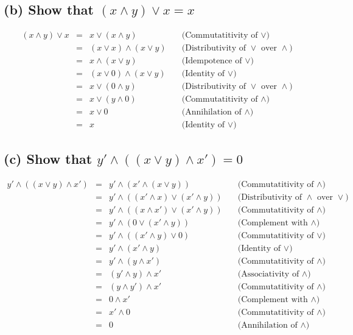 \documentclass[]{article}
\begin{document}
\begin{spacing}{1.5}
	\subsection*{(b) Show that $ (x \wedge  y) \vee  x = x $}
	\[\begin{array}{rclr}
		(x \wedge  y) \vee  x&=& x \vee  (x \wedge  y) &\quad\text{(Commutatitivity of $\vee$)}\\
		&=& (x \vee  x) \wedge  (x \vee  y) &\quad\text{(Distributivity of $\vee$ over $\wedge$)}\\
		&=& x \wedge  (x \vee  y) &\quad\text{(Idempotence of $\vee$)}\\
		&=& (x \vee  0 ) \wedge  (x \vee  y) &\quad\text{(Identity of $\vee$)}\\
		&=& x \vee  (0  \wedge  y) &\quad\text{(Distributivity of $\vee$ over $\wedge$)}\\
		&=& x \vee  (y \wedge  0 ) &\quad\text{(Commutatitivity of $\wedge$)}\\
		&=& x \vee  0  &\quad\text{(Annihilation of $\wedge$)}\\
		&=& x &\quad\text{(Identity of $\vee$)}
	\end{array}\]

	\subsection*{(c) Show that $ 	y'  \wedge  ((x \vee  y) \wedge  x' ) = 0 $}
	\[\begin{array}{rclr}
		y'  \wedge  ((x \vee  y) \wedge  x' )&=& y'  \wedge  (x'  \wedge  (x \vee  y)) &\quad\text{(Commutatitivity of $\wedge$)}\\
		&=& y'  \wedge  ((x'  \wedge  x) \vee  (x'  \wedge  y)) &\quad\text{(Distributivity of $\wedge$ over $\vee$)}\\
		&=& y'  \wedge  ((x \wedge  x' ) \vee  (x'  \wedge  y)) &\quad\text{(Commutatitivity of $\wedge$)}\\
		&=& y'  \wedge  (0  \vee  (x'  \wedge  y)) &\quad\text{(Complement with $\wedge$)}\\
		&=& y'  \wedge  ((x'  \wedge  y) \vee  0 ) &\quad\text{(Commutatitivity of $\vee$)}\\
		&=& y'  \wedge  (x'  \wedge  y) &\quad\text{(Identity of $\vee$)}\\
		&=& y'  \wedge  (y \wedge  x' ) &\quad\text{(Commutatitivity of $\wedge$)}\\
		&=& (y'  \wedge  y) \wedge  x'  &\quad\text{(Associativity of $\wedge$)}\\
		&=& (y \wedge  y' ) \wedge  x'  &\quad\text{(Commutatitivity of $\wedge$)}\\
		&=& 0  \wedge  x'  &\quad\text{(Complement with $\wedge$)}\\
		&=& x'  \wedge  0  &\quad\text{(Commutatitivity of $\wedge$)}\\
		&=& 0  &\quad\text{(Annihilation of $\wedge$)}
	\end{array}\]



\end{spacing}
\end{document}
